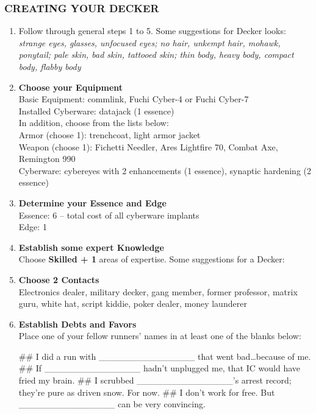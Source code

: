 \subsubsection{CREATING YOUR DECKER}
\begin{enumerate}
    \item Follow through general steps 1 to 5. Some suggestions for Decker looks: \textit{strange eyes, glasses, unfocused eyes; no hair, unkempt hair, mohawk, ponytail; pale skin, bad skin, tattooed skin; thin body, heavy body, compact body, flabby body}
    
    \item \textbf{Choose your Equipment} \\
    Basic Equipment: commlink, Fuchi Cyber-4 or Fuchi Cyber-7 \\
    Installed Cyberware: datajack (1 essence) \\
    In addition, choose from the lists below: \\
    Armor (choose 1): trenchcoat, light armor jacket \\
    Weapon (choose 1): Fichetti Needler, Ares Lightfire 70, Combat Axe, Remington 990 \\
    Cyberware: cybereyes with 2 enhancements (1 essence), synaptic hardening (2 essence)
    
    \item \textbf{Determine your Essence and Edge} \\
    Essence: 6 – total cost of all cyberware implants \\
    Edge: 1

    \item \textbf{Establish some expert Knowledge} \\
    Choose \textbf{\textsf{Skilled + 1}} areas of expertise. Some suggestions for a Decker: \textit{}
    
    \item \textbf{Choose 2 Contacts} \\
    Electronics dealer, military decker, gang member, former professor, matrix guru, white hat, script kiddie, poker dealer, money launderer
    
    \item \textbf{Establish Debts and Favors} \\
    Place one of your fellow runners’ names in at least one of the blanks below:
        \begin{easylist}
            ## I did a run with \_\_\_\_\_\_\_\_\_\_\_\_\_\_\_ that went bad…because of me.
            ## If \_\_\_\_\_\_\_\_\_\_\_\_\_\_\_ hadn’t unplugged me, that IC would have fried my brain.
            ## I scrubbed \_\_\_\_\_\_\_\_\_\_\_\_\_\_\_’s arrest record; they’re pure as driven snow. For now.
            ## I don’t work for free. But \_\_\_\_\_\_\_\_\_\_\_\_\_\_\_ can be very convincing.
        \end{easylist}
    

\end{enumerate}
